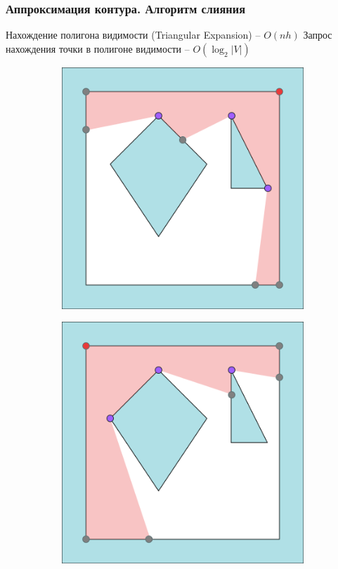 \documentclass[10pt, unicode]{beamer}
\begin{document}
    \begin{frame}
        \frametitle{Аппроксимация контура. Алгоритм слияния}
        Нахождение полигона видимости (Triangular Expansion) -- $O\left(nh\right)$
        Запрос нахождения точки в полигоне видимости -- $O\left(\log_2\left|V\right|\right)$
        \begin{figure}[H]
            \centering
            \begin{subfigure}[t]{0.49\linewidth}
                \centering
                \includegraphics[scale=0.4]{visibility_polygon_prev_vertex.png}
            \end{subfigure}
            \begin{subfigure}[t]{0.49\linewidth}
                \centering
                \includegraphics[scale=0.4]{visibility_polygon_current_vertex.png}
            \end{subfigure}
        \end{figure}
    \end{frame}
\end{document}
